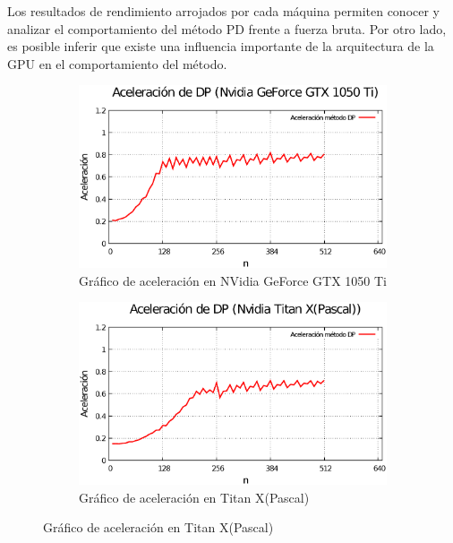 \documentclass[10pt, conference, compsocconf, onecolumn]{IEEEtran}
\begin{document}
 
 Los resultados de rendimiento arrojados por cada m\'aquina permiten conocer y analizar el comportamiento del m\'etodo PD frente a fuerza bruta. Por otro lado, es posible inferir que existe una influencia importante de la arquitectura de la GPU en el comportamiento del m\'etodo.
 \begin{figure}[H]
 	\centering
 	\begin{subfigure}[b]{0.475\textwidth}
 		\centering
 		\includegraphics[width=\textwidth]{figures/ace_Nvidia_gtx.eps}
 		\caption{Gr\'afico de aceleraci\'on en NVidia GeForce GTX 1050 Ti}
 		
 		\label{fig_Nvidiagtx}
 	\end{subfigure}
 	\hfill
 	\begin{subfigure}[b]{0.475\textwidth}
 		\centering 
 		\includegraphics[width=\textwidth]{figures/Ace_pascal.eps}
 		\caption{Gr\'afico de aceleraci\'on en Titan X(Pascal)}
 	   

\end{subfigure}
\end{figure}
\end{document}
